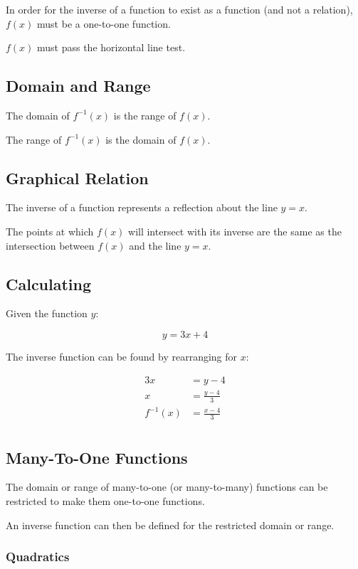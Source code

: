 \documentclass[a4paper,11pt]{report}
\begin{document}
In order for the inverse of a function to exist as a function (and not a
relation), $f(x)$ must be a one-to-one function.

$f(x)$ must pass the horizontal line test.

\subsection{Domain and Range}

The domain of $f^{-1}(x)$ is the range of $f(x)$.

The range of $f^{-1}(x)$ is the domain of $f(x)$.

\subsection{Graphical Relation}

The inverse of a function represents a reflection about the line $y = x$.

The points at which $f(x)$ will intersect with its inverse are the same as the
intersection between $f(x)$ and the line $y = x$.

\subsection{Calculating}

Given the function $y$:

$$
y = 3x + 4
$$

The inverse function can be found by rearranging for $x$:

$$
\begin{aligned}
3x & = y - 4 \\
x & = \frac{y - 4}{3} \\
f^{-1}(x) & = \frac{x - 4}{3} \\
\end{aligned}
$$

\subsection{Many-To-One Functions}

The domain or range of many-to-one (or many-to-many) functions can be
restricted to make them one-to-one functions.

An inverse function can then be defined for the restricted domain or range.

\subsubsection{Quadratics}
\end{document}
